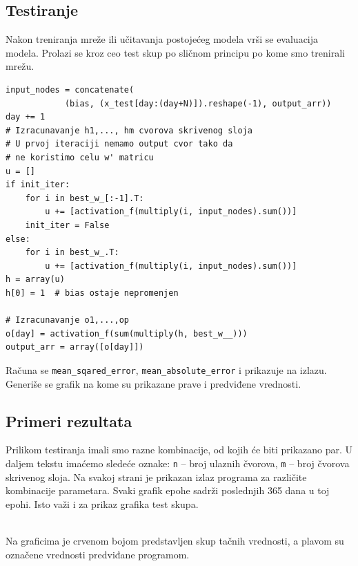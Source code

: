 \documentclass[a4paper]{article}
\begin{document}
\subsection{Testiranje}
Nakon treniranja mreže ili učitavanja postojećeg modela vrši se evaluacija modela. Prolazi se kroz ceo test skup po sličnom principu po kome smo trenirali mrežu.
\begin{verbatim}
input_nodes = concatenate(
            (bias, (x_test[day:(day+N)]).reshape(-1), output_arr))
day += 1
# Izracunavanje h1,..., hm cvorova skrivenog sloja
# U prvoj iteraciji nemamo output cvor tako da 
# ne koristimo celu w' matricu
u = []
if init_iter:
    for i in best_w_[:-1].T:
        u += [activation_f(multiply(i, input_nodes).sum())]
    init_iter = False
else:
    for i in best_w_.T:
        u += [activation_f(multiply(i, input_nodes).sum())]
h = array(u)
h[0] = 1  # bias ostaje nepromenjen

# Izracunavanje o1,...,op
o[day] = activation_f(sum(multiply(h, best_w__)))
output_arr = array([o[day]])
\end{verbatim}
Računa se \texttt{mean\_sqared\_error}, \texttt{mean\_absolute\_error} i prikazuje na izlazu. Generiše se grafik na kome su prikazane prave i predviđene vrednosti.

\subsection{Primeri rezultata}
Prilikom testiranja imali smo razne kombinacije, od kojih će biti prikazano par. U daljem tekstu imaćemo sledeće oznake: \texttt{n} -- broj ulaznih čvorova, \texttt{m} -- broj čvorova skrivenog sloja.
Na svakoj strani je prikazan izlaz programa za različite kombinacije parametara. Svaki grafik epohe sadrži poslednjih 365 dana u toj epohi. Isto važi i za prikaz grafika test skupa.

\\

Na graficima je crvenom bojom predstavljen skup tačnih vrednosti, a plavom su označene vrednosti predviđane programom.


\pagebreak %
\end{document}

